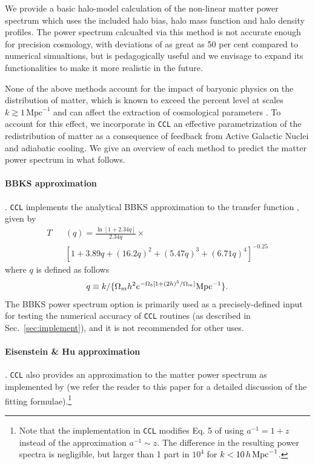 \documentclass[\docopts]{\docclass}
\newcommand{\ccl}{{\tt CCL}\xspace}
\begin{document}
We provide a basic halo-model calculation of the non-linear matter power spectrum which uses the included halo bias, halo mass function and halo density profiles. The power spectrum calcualted via this method is not accurate enough for precision cosmology, with deviations of as great as 50 per cent compared to numerical simualtions, but is pedagogically useful and we envisage to expand its functionalities to make it more realistic in the future.

None of the above methods account for the impact of baryonic physics on the distribution of matter, which is known to exceed the percent level at scales $k \gtrsim 1\,\text{Mpc}^{-1}$ \citep{vanDaalen11,Illustris,Hellwing16,Springel17,Chisari18} and can affect the extraction of cosmological parameters \citep{Semboloni11,Semboloni13,Mohammed14,Eifler15,Mohammed17}. To account for this effect, we incorporate in \ccl an effective parametrization \citep{Schneider15} of the redistribution of matter as a consequence of feedback from Active Galactic Nuclei and adiabatic cooling. We give an overview of each method to predict the matter power spectrum in what follows.

\paragraph{\bf BBKS approximation}. \ccl implements the analytical BBKS approximation to the transfer function \citep{BBKS}, given by
\begin{eqnarray}
  \label{eq:bbks}
  T&&(q) = \frac{\ln[1+2.34q]}{2.34q}\times\\
  &&[1+3.89q+(16.2q)^2+(5.47q)^3+(6.71q)^4]^{-0.25}\nonumber
\end{eqnarray}
where $q$ is defined as follows \citep{Sugiyama95}
\begin{equation}
  q \equiv k/\{\Omega_m h^2 e^{-\Omega_b[1+(2h)^5/\Omega_m]}{\rm Mpc}^{-1}\}.
\end{equation}
The BBKS power spectrum option is primarily used as a precisely-defined input for testing the numerical accuracy of \ccl routines (as described in Sec.~\ref{sec:implement}), and it is not recommended for other uses.

\paragraph{\bf Eisenstein \& Hu approximation}. \ccl also provides an approximation to the matter power spectrum as implemented by \citet{1998ApJ...496..605E} (we refer the reader to this paper for a detailed discussion of the fitting formulae).\footnote{Note that the implementation in \ccl modifies Eq. 5 of \citet{1998ApJ...496..605E} using $a^{-1}=1+z$ instead of the approximation $a^{-1}\sim z$. The difference in the resulting power spectra is negligible, but larger than 1 part in $10^4$ for $k<10\,h\,{\rm Mpc}^{-1}$.}
\end{document}
